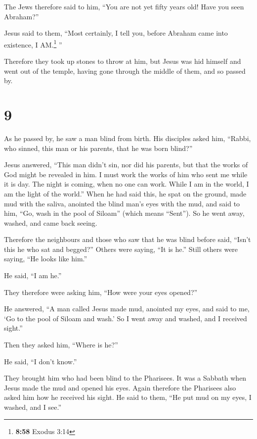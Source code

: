  The Jews therefore said to him, ``You are not yet fifty
years old! Have you seen Abraham?''

 Jesus said to them, ``Most certainly, I tell you, before
Abraham came into existence, I AM.\footnote{\textbf{8:58} Exodus 3:14}
''

 Therefore they took up stones to throw at him, but Jesus
was hid himself and went out of the temple, having gone through the
middle of them, and so passed by.

\hypertarget{section-8}{%
\section{9}\label{section-8}}

 As he passed by, he saw a man blind from birth.
 His disciples asked him, ``Rabbi, who sinned, this man or
his parents, that he was born blind?''

 Jesus answered, ``This man didn't sin, nor did his
parents, but that the works of God might be revealed in him.
 I must work the works of him who sent me while it is day.
The night is coming, when no one can work.  While I am in
the world, I am the light of the world.''  When he had
said this, he spat on the ground, made mud with the saliva, anointed the
blind man's eyes with the mud,  and said to him, ``Go,
wash in the pool of Siloam'' (which means ``Sent''). So he went away,
washed, and came back seeing.

 Therefore the neighbours and those who saw that he was
blind before said, ``Isn't this he who sat and begged?'' 
Others were saying, ``It is he.'' Still others were saying, ``He looks
like him.''

He said, ``I am he.''

 They therefore were asking him, ``How were your eyes
opened?''

 He answered, ``A man called Jesus made mud, anointed my
eyes, and said to me, `Go to the pool of Siloam and wash.' So I went
away and washed, and I received sight.''

 Then they asked him, ``Where is he?''

He said, ``I don't know.''

 They brought him who had been blind to the Pharisees.
 It was a Sabbath when Jesus made the mud and opened his
eyes.  Again therefore the Pharisees also asked him how
he received his sight. He said to them, ``He put mud on my eyes, I
washed, and I see.''


